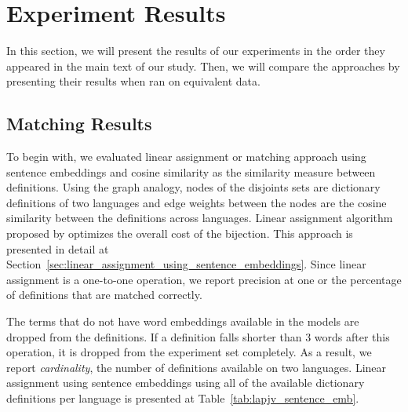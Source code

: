 \section{Experiment Results}%
\label{sec:results}

In this section, we will present the results of our experiments in the order they appeared in the main text of our study.
Then, we will compare the approaches by presenting their results when ran on equivalent data.

\subsection{Matching Results}%
\label{sub:matching_results}

To begin with, we evaluated linear assignment or matching approach using sentence embeddings and cosine similarity as the similarity measure between definitions.
Using the graph analogy, nodes of the disjoints sets are dictionary definitions of two languages and edge weights between the nodes are the cosine similarity between the definitions across languages.
Linear assignment algorithm proposed by \textcite{jonker_shortest_1987} optimizes the overall cost of the bijection.
This approach is presented in detail at Section~\ref{sec:linear_assignment_using_sentence_embeddings}.
Since linear assignment is a one-to-one operation, we report precision at one or the percentage of definitions that are matched correctly.

The terms that do not have word embeddings available in the models are dropped from the definitions.
If a definition falls shorter than 3 words after this operation, it is dropped from the experiment set completely.
As a result, we report \emph{cardinality}, the number of definitions available on two languages.
Linear assignment using sentence embeddings using all of the available dictionary definitions per language is presented at Table~\ref{tab:lapjv_sentence_emb}.

